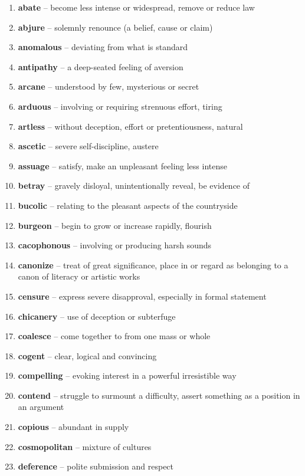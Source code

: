 \begin{enumerate}[wide,labelindent=0pt]
\item \textbf{abate} -- become less intense or widespread, remove or reduce law
\item \textbf{abjure} -- solemnly renounce (a belief, cause or claim)
\item \textbf{anomalous} -- deviating from what is standard
\item \textbf{antipathy} -- a deep-seated feeling of aversion
\item \textbf{arcane} -- understood by few, mysterious or secret
\item \textbf{arduous} -- involving or requiring strenuous effort, tiring
\item \textbf{artless} -- without deception, effort or pretentiousness, natural
\item \textbf{ascetic} -- severe self-discipline, austere
\item \textbf{assuage} -- satisfy, make an unpleasant feeling less intense
\item \textbf{betray} -- gravely disloyal, unintentionally reveal, be evidence of
\item \textbf{bucolic} -- relating to the pleasant aspects of the countryside
\item \textbf{burgeon} -- begin to grow or increase rapidly, flourish
\item \textbf{cacophonous} -- involving or producing harsh sounds
\item \textbf{canonize} -- treat of great significance, place in or regard as belonging to a canon of literacy or artistic works
\item \textbf{censure} -- express severe disapproval, especially in formal statement
\item \textbf{chicanery} -- use of deception or subterfuge
\item \textbf{coalesce} -- come together to from one mass or whole
\item \textbf{cogent} -- clear, logical and convincing
\item \textbf{compelling} -- evoking interest in a powerful irresistible way
\item \textbf{contend} -- struggle to surmount a difficulty, assert something as a position in an argument
\item \textbf{copious} -- abundant in supply
\item \textbf{cosmopolitan} -- mixture of cultures
\item \textbf{deference} -- polite submission and respect

\end{enumerate}
